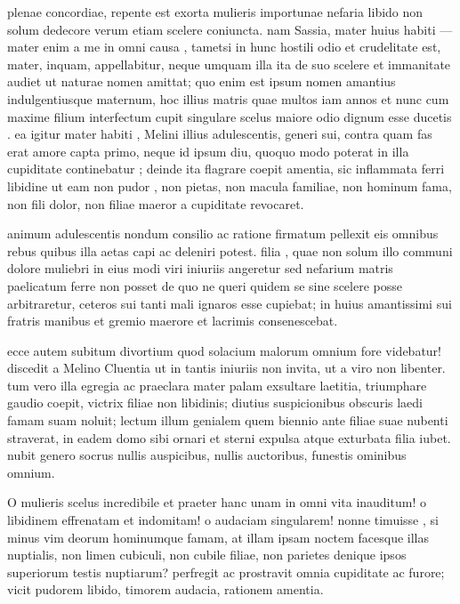  plenae concordiae, repente est exorta mulieris importunae nefaria libido non solum dedecore verum etiam scelere coniuncta. nam Sassia, mater huius habiti — mater enim a me in omni causa , tametsi in hunc hostili odio et crudelitate est, mater, inquam, appellabitur, neque umquam illa ita de suo scelere et immanitate audiet ut naturae nomen amittat; quo enim est ipsum nomen amantius indulgentiusque maternum, hoc illius matris quae multos iam annos et nunc cum maxime filium interfectum cupit singulare scelus maiore odio dignum esse ducetis . ea igitur mater habiti , Melini illius adulescentis, generi sui, contra quam fas erat amore capta primo, neque id ipsum diu, quoquo modo poterat in illa cupiditate continebatur ; deinde ita flagrare coepit amentia, sic inflammata ferri libidine ut eam non pudor , non pietas, non macula familiae, non hominum fama, non fili dolor, non filiae maeror a cupiditate revocaret.

 animum adulescentis nondum consilio ac ratione firmatum pellexit eis omnibus rebus quibus illa aetas capi ac deleniri potest. filia , quae non solum illo communi dolore muliebri in eius modi viri iniuriis angeretur sed nefarium matris paelicatum ferre non posset de quo ne queri quidem se sine scelere posse arbitraretur, ceteros sui tanti mali ignaros esse cupiebat; in huius amantissimi sui fratris manibus et gremio maerore et lacrimis consenescebat.

 ecce autem subitum divortium quod solacium malorum omnium fore videbatur! discedit a Melino Cluentia ut in tantis iniuriis non invita, ut a viro non libenter. tum vero illa egregia ac praeclara mater palam exsultare laetitia, triumphare gaudio coepit, victrix filiae non libidinis; diutius suspicionibus obscuris laedi famam suam noluit; lectum illum genialem quem biennio ante filiae suae nubenti straverat, in eadem domo sibi ornari et sterni expulsa atque exturbata filia iubet. nubit genero socrus nullis auspicibus, nullis auctoribus, funestis ominibus omnium.

 O mulieris scelus incredibile et praeter hanc unam in omni vita inauditum! o libidinem effrenatam et indomitam! o audaciam singularem! nonne timuisse , si minus vim deorum hominumque famam, at illam ipsam noctem facesque illas nuptialis, non limen cubiculi, non cubile filiae, non parietes denique ipsos superiorum testis nuptiarum? perfregit ac prostravit omnia cupiditate ac furore; vicit pudorem libido, timorem audacia, rationem amentia.

